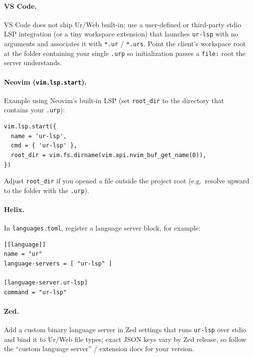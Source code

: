 \documentclass{article}
\newcommand{\cd}[1]{\texttt{#1}}
\begin{document}
\paragraph{VS Code.}
VS Code does not ship Ur/Web built-in; use a user-defined or third-party stdio LSP integration (or a tiny workspace extension) that launches \cd{ur-lsp} with no arguments and associates it with \cd{*.ur} / \cd{*.urs}. Point the client's workspace root at the folder containing your single \cd{.urp} so initialization passes a \cd{file:} root the server understands.

\paragraph{Neovim (\texttt{vim.lsp.start}).}
Example using Neovim's built-in LSP (set \texttt{root\_dir} to the directory that contains your \cd{.urp}):
\begin{verbatim}
vim.lsp.start({
  name = 'ur-lsp',
  cmd = { 'ur-lsp' },
  root_dir = vim.fs.dirname(vim.api.nvim_buf_get_name(0)),
})
\end{verbatim}
Adjust \texttt{root\_dir} if you opened a file outside the project root (e.g.\ resolve upward to the folder with the \cd{.urp}).

\paragraph{Helix.}
In \cd{languages.toml}, register a language server block, for example:
\begin{verbatim}
[[language]]
name = "ur"
language-servers = [ "ur-lsp" ]

[language-server.ur-lsp]
command = "ur-lsp"
\end{verbatim}

\paragraph{Zed.}
Add a custom binary language server in Zed settings that runs \cd{ur-lsp} over stdio and bind it to Ur/Web file types; exact JSON keys vary by Zed release, so follow the ``custom language server'' / extension docs for your version.
\end{document}
